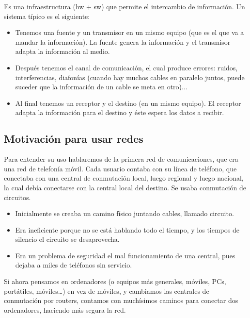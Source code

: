 \begin{definicion}
    Es una infraestructura (hw + sw) que permite el intercambio de información. Un sistema típico es el siguiente:
    \begin{itemize}
        \item Tenemos una fuente y un transmisor en un mismo equipo (que es el que va a mandar la información). La fuente genera la información y el transmisor adapta la información al medio.
        \item Después tenemos el canal de comunicación, el cual produce errores: ruidos, interferencias, diafonías (cuando hay muchos cables en paralelo juntos, puede suceder que la información de un cable se meta en otro)...
        \item Al final tenemos un receptor y el destino (en un mismo equipo). El receptor adapta la información para el destino y éste espera los datos a recibir. 
    \end{itemize}
\end{definicion}


\subsection{Motivación para usar redes}
Para entender su uso hablaremos de la primera red de comunicaciones, que era una red de telefonía móvil. 
Cada usuario contaba con su línea de teléfono, que conectaba con una central de conmutación local, luego regional y luego nacional, la cual debía conectarse con la central local del destino. Se usaba conmutación de circuitos. 
\begin{itemize}
    \item Inicialmente se creaba un camino físico juntando cables, llamado circuito. 
    \item Era ineficiente porque no se está hablando todo el tiempo, y los tiempos de silencio el circuito se desaprovecha. 
    \item Era un problema de seguridad el mal funcionamiento de una central, pues dejaba a miles de teléfonos sin servicio. 
\end{itemize}

Si ahora pensamos en ordenadores (o equipos más generales, móviles, PCs, portátiles, móviles\ldots) en vez de móviles, y cambiamos las centrales de conmutación por routers, contamos con muchísimos caminos para conectar dos ordenadores, haciendo más segura la red.\\

